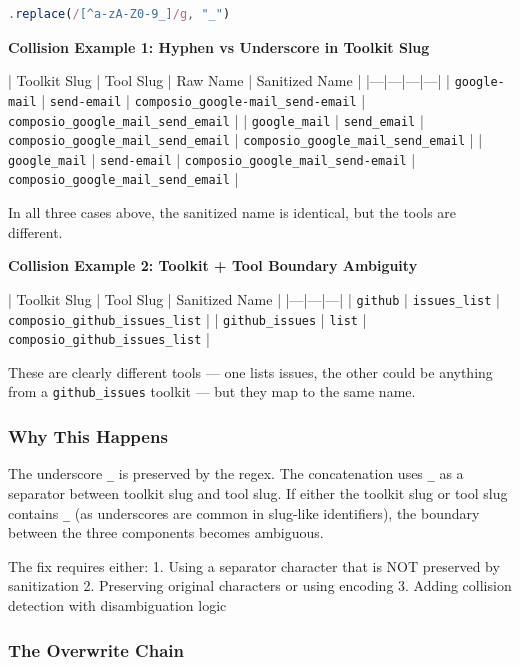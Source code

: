 \begin{lstlisting}[language=TypeScript]
.replace(/[^a-zA-Z0-9_]/g, "_")

\end{lstlisting}



\textbf{Collision Example 1: Hyphen vs Underscore in Toolkit Slug}

| Toolkit Slug | Tool Slug | Raw Name | Sanitized Name |
|---|---|---|---|
| \texttt{google-mail} | \texttt{send-email} | \texttt{composio\_google-mail\_send-email} | \texttt{composio\_google\_mail\_send\_email} |
| \texttt{google\_mail} | \texttt{send\_email} | \texttt{composio\_google\_mail\_send\_email} | \texttt{composio\_google\_mail\_send\_email} |
| \texttt{google\_mail} | \texttt{send-email} | \texttt{composio\_google\_mail\_send-email} | \texttt{composio\_google\_mail\_send\_email} |

In all three cases above, the sanitized name is identical, but the tools are different.

\textbf{Collision Example 2: Toolkit + Tool Boundary Ambiguity}

| Toolkit Slug | Tool Slug | Sanitized Name |
|---|---|---|
| \texttt{github} | \texttt{issues\_list} | \texttt{composio\_github\_issues\_list} |
| \texttt{github\_issues} | \texttt{list} | \texttt{composio\_github\_issues\_list} |

These are clearly different tools — one lists issues, the other could be anything from a \texttt{github\_issues} toolkit — but they map to the same name.

\subsubsection*{Why This Happens}

The underscore \texttt{\_} is preserved by the regex. The concatenation uses \texttt{\_} as a separator between toolkit slug and tool slug. If either the toolkit slug or tool slug contains \texttt{\_} (as underscores are common in slug-like identifiers), the boundary between the three components becomes ambiguous.

The fix requires either:
1. Using a separator character that is NOT preserved by sanitization
2. Preserving original characters or using encoding
3. Adding collision detection with disambiguation logic

\subsubsection*{The Overwrite Chain}


